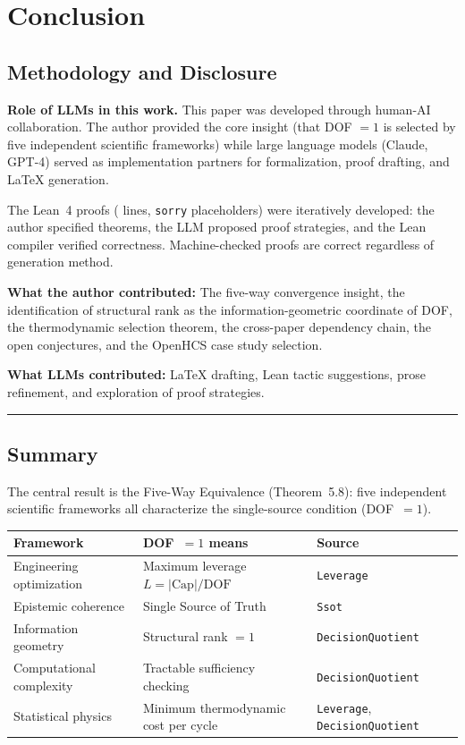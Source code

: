 \section{Conclusion}\label{conclusion}

\subsection{Methodology and Disclosure}

\textbf{Role of LLMs in this work.} This paper was developed through human-AI collaboration. The author provided the core insight (that DOF $= 1$ is selected by five independent scientific frameworks) while large language models (Claude, GPT-4) served as implementation partners for formalization, proof drafting, and \LaTeX{} generation.

The Lean~4 proofs (\LeanTotalLines{} lines, \LeanTotalSorry{} \texttt{sorry} placeholders) were iteratively developed: the author specified theorems, the LLM proposed proof strategies, and the Lean compiler verified correctness. Machine-checked proofs are correct regardless of generation method.

\textbf{What the author contributed:} The five-way convergence insight, the identification of structural rank as the information-geometric coordinate of DOF, the thermodynamic selection theorem, the cross-paper dependency chain, the open conjectures, and the OpenHCS case study selection.

\textbf{What LLMs contributed:} \LaTeX{} drafting, Lean tactic suggestions, prose refinement, and exploration of proof strategies.

\begin{center}\rule{0.5\linewidth}{0.5pt}\end{center}

\subsection{Summary}

The central result is the Five-Way Equivalence (Theorem~5.8): five independent scientific frameworks all characterize the single-source condition (DOF~$= 1$).

\begin{center}
\begin{tabular}{lll}
\hline
\textbf{Framework} & \textbf{DOF~$= 1$ means} & \textbf{Source} \\
\hline
Engineering optimization & Maximum leverage $L = |\mathrm{Cap}|/\mathrm{DOF}$ & \nolinkurl{Leverage} \\
Epistemic coherence & Single Source of Truth & \nolinkurl{Ssot} \\
Information geometry & Structural rank $= 1$ & \nolinkurl{DecisionQuotient} \\
Computational complexity & Tractable sufficiency checking & \nolinkurl{DecisionQuotient} \\
Statistical physics & Minimum thermodynamic cost per cycle & \nolinkurl{Leverage}, \nolinkurl{DecisionQuotient} \\
\hline
\end{tabular}
\end{center}

